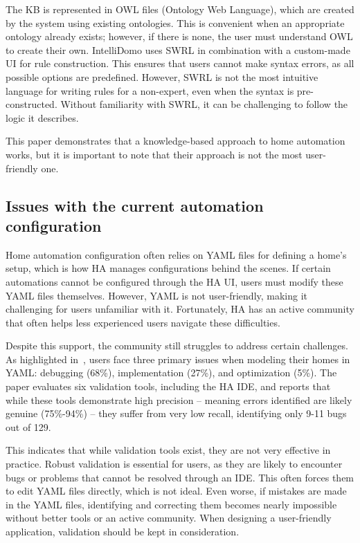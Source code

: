 \documentclass[11pt,a4paper]{report}
\begin{document}
The KB is represented in OWL files (Ontology Web Language), which are created by the system using existing ontologies. This is convenient when an appropriate ontology already exists; however, if there is none, the user must understand OWL to create their own. IntelliDomo uses SWRL in combination with a custom-made UI for rule construction. This ensures that users cannot make syntax errors, as all possible options are predefined. However, SWRL is not the most intuitive language for writing rules for a non-expert, even when the syntax is pre-constructed. Without familiarity with SWRL, it can be challenging to follow the logic it describes.

This paper demonstrates that a knowledge-based approach to home automation works, but it is important to note that their approach is not the most user-friendly one.

\subsection{Issues with the current automation configuration}
Home automation configuration often relies on YAML files for defining a home's setup, which is how HA manages configurations behind the scenes. If certain automations cannot be configured through the HA UI, users must modify these YAML files themselves. However, YAML is not user-friendly, making it challenging for users unfamiliar with it. Fortunately, HA has an active community that often helps less experienced users navigate these difficulties.

Despite this support, the community still struggles to address certain challenges. As highlighted in~\cite{SOTA_AutomationConfigurationSmarthome}, users face three primary issues when modeling their homes in YAML: debugging (68\%), implementation (27\%), and optimization (5\%). The paper evaluates six validation tools, including the HA IDE, and reports that while these tools demonstrate high precision -- meaning errors identified are likely genuine (75\%-94\%) -- they suffer from very low recall, identifying only 9-11 bugs out of 129.

This indicates that while validation tools exist, they are not very effective in practice. Robust validation is essential for users, as they are likely to encounter bugs or problems that cannot be resolved through an IDE. This often forces them to edit YAML files directly, which is not ideal. Even worse, if mistakes are made in the YAML files, identifying and correcting them becomes nearly impossible without better tools or an active community. When designing a user-friendly application, validation should be kept in consideration.
\end{document}
